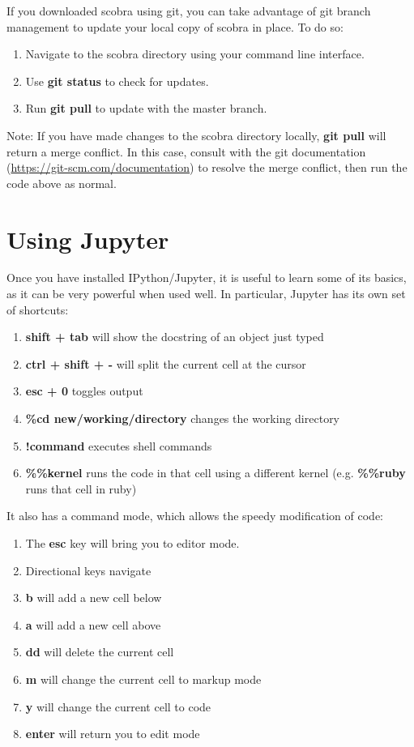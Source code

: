If you downloaded scobra using git, you can take advantage of git branch management to update your local copy of scobra in place. To do so:

\begin{enumerate}
\item Navigate to the scobra directory using your command line interface.
\item Use \textbf{git status} to check for updates.
\item Run \textbf{git pull} to update with the master branch.
\end{enumerate}

Note: If you have made changes to the scobra directory locally, \textbf{git pull} will return a merge conflict. In this case, consult with the git documentation (\url{https://git-scm.com/documentation}) to resolve the merge conflict, then run the code above as normal.


\section{Using Jupyter}

Once you have installed IPython/Jupyter, it is useful to learn some of its basics, as it can be very powerful when used well. In particular, Jupyter has its own set of shortcuts:

\begin{enumerate}
\item \textbf{shift + tab} will show the docstring of an object just typed
\item \textbf{ctrl + shift + -} will split the current cell at the cursor
\item \textbf{esc + 0} toggles output
\item \textbf{\%cd new/working/directory} changes the working directory
\item \textbf{!command} executes shell commands
\item \textbf{\%\%kernel} runs the code in that cell using a different kernel (e.g. \textbf{\%\%ruby} runs that cell in ruby)
\end{enumerate}

It also has a command mode, which allows the speedy modification of code:

\begin{enumerate}
\item The \textbf{esc} key will bring you to editor mode. 
\item Directional keys navigate
\item \textbf{b} will add a new cell below
\item \textbf{a} will add a new cell above
\item \textbf{dd} will delete the current cell
\item \textbf{m} will change the current cell to markup mode
\item \textbf{y} will change the current cell to code
\item \textbf{enter} will return you to edit mode
\end{enumerate}

